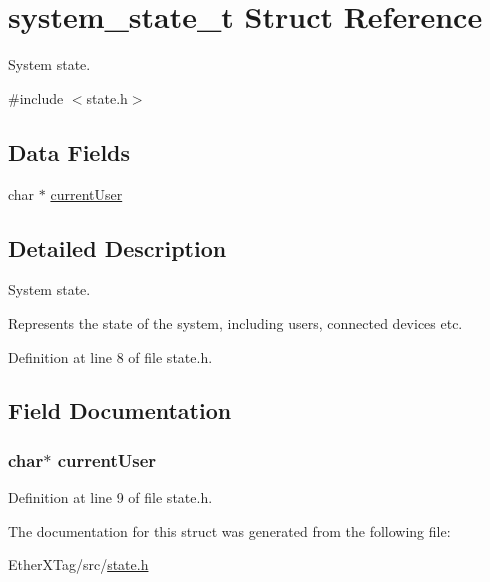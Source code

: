 \hypertarget{structsystem__state__t}{\section{system\-\_\-state\-\_\-t Struct Reference}
\label{structsystem__state__t}
}


System state.  




{\ttfamily \#include $<$state.\-h$>$}

\subsection*{Data Fields}
\begin{DoxyCompactItemize}
\item 
char $\ast$ \hyperlink{structsystem__state__t_a5ccabdf4b4e4782c11b1a8262ddc2899}{current\-User}
\end{DoxyCompactItemize}


\subsection{Detailed Description}
System state. 

Represents the state of the system, including users, connected devices etc. 

Definition at line 8 of file state.\-h.



\subsection{Field Documentation}
\hypertarget{structsystem__state__t_a5ccabdf4b4e4782c11b1a8262ddc2899}{
\subsubsection[{current\-User}]{\setlength{\rightskip}{0pt plus 5cm}char$\ast$ current\-User}}\label{structsystem__state__t_a5ccabdf4b4e4782c11b1a8262ddc2899}


Definition at line 9 of file state.\-h.



The documentation for this struct was generated from the following file\-:\begin{DoxyCompactItemize}
\item 
Ether\-X\-Tag/src/\hyperlink{state_8h}{state.\-h}\end{DoxyCompactItemize}
